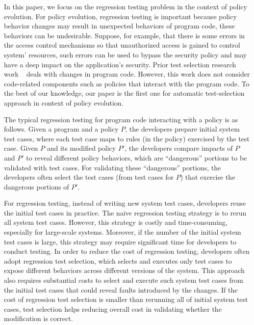 In this paper, we focus on the regression testing problem in the context of policy evolution.
For policy evolution, regression testing is important because policy behavior changes may
result in unexpected behaviors of program code, these behaviors can be undesirable. Suppose, for example, that there is some errors 
in the access control mechanisms so that unauthorized access is gained to control system' resources, such errors can be used to bypass the security policy and may have a deep impact on the application's security.
Prior test selection research work ~\cite{Rothermel:1996:ART:235681.235682,Graves:2001:ESR:367008.367020,Elbaum:2000:PTC:347324.348910}
deals with changes in program code. However, this work does not consider code-related components such as policies that interact with the program code.
To the best of our knowledge,
our paper is the first one for automatic test-selection approach in context of policy
evolution.

The typical regression testing for program code interacting with a policy is as follows.
Given a program and a policy $P$, the developers prepare initial system test cases, where
each test case maps to rules (in the policy) exercised by the test case. Given $P$ and its modified
policy $P'$, the developers compare impacts of $P$ and $P'$ to
reveal different policy behaviors, which are ``dangerous'' portions to be validated with
test cases. For validating these ``dangerous'' portions, the developers often select the test cases (from test cases for $P$) that exercise the dangerous
portions of $P'$.

For regression testing, instead of writing new system test cases, developers reuse the initial test cases in practice. The naive regression testing strategy is to rerun all system test cases. However,
 this strategy is costly and time-consuming, especially for large-scale systems. Moreover, if the number of the initial 
system test cases is large, this strategy may require significant time for developers to conduct testing. In order to
 reduce the cost of regression testing, developers often adopt regression test selection, which selects and executes only
 test cases to expose different behaviors across different versions of the system. This approach also requires substantial
 costs to select and execute such system test cases from the initial test cases that could reveal faults introduced by the changes. 
If the cost of regression test selection is smaller than rerunning all of initial system test cases, test selection helps reducing overall cost in validating whether the modification is correct. 


